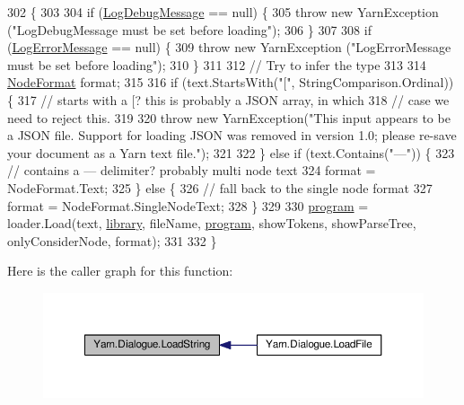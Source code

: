 \begin{DoxyCode}
302                                                                                                            
                                                 \{
303 
304             \textcolor{keywordflow}{if} (\hyperlink{a00088_a381f48bb0fbb294f8cf44ca57f11be31}{LogDebugMessage} == null) \{
305                 \textcolor{keywordflow}{throw} \textcolor{keyword}{new} YarnException (\textcolor{stringliteral}{"LogDebugMessage must be set before loading"});
306             \}
307 
308             \textcolor{keywordflow}{if} (\hyperlink{a00088_a9801e83dd044d6498fdf6ebcc6bec5ac}{LogErrorMessage} == null) \{
309                 \textcolor{keywordflow}{throw} \textcolor{keyword}{new} YarnException (\textcolor{stringliteral}{"LogErrorMessage must be set before loading"});
310             \}
311 
312             \textcolor{comment}{// Try to infer the type}
313 
314             \hyperlink{a00048_ad7ebb46e7309ead8767383a672b3272f}{NodeFormat} format;
315 
316             \textcolor{keywordflow}{if} (text.StartsWith(\textcolor{stringliteral}{"["}, StringComparison.Ordinal)) \{
317                 \textcolor{comment}{// starts with a [? this is probably a JSON array, in which}
318                 \textcolor{comment}{// case we need to reject this.}
319 
320                 \textcolor{keywordflow}{throw} \textcolor{keyword}{new} YarnException(\textcolor{stringliteral}{"This input appears to be a JSON file. Support for loading JSON was
       removed in version 1.0; please re-save your document as a Yarn text file."});
321                 
322             \} \textcolor{keywordflow}{else} \textcolor{keywordflow}{if} (text.Contains(\textcolor{stringliteral}{"---"})) \{
323                 \textcolor{comment}{// contains a --- delimiter? probably multi node text}
324                 format = NodeFormat.Text;
325             \} \textcolor{keywordflow}{else} \{
326                 \textcolor{comment}{// fall back to the single node format}
327                 format = NodeFormat.SingleNodeText;
328             \}
329 
330             \hyperlink{a00088_a0a1cca92325f430425d784d416cb5c2b}{program} = loader.Load(text, \hyperlink{a00088_ae660d4cfb6e296358d2f61d8ee74c66a}{library}, fileName, \hyperlink{a00088_a0a1cca92325f430425d784d416cb5c2b}{program}, showTokens, 
      showParseTree, onlyConsiderNode, format);
331 
332         \}
\end{DoxyCode}


Here is the caller graph for this function\-:
\nopagebreak
\begin{figure}[H]
\begin{center}
\leavevmode
\includegraphics[width=350pt]{a00088_a7b66187877ec8a2bfee2298d3dd16706_icgraph}
\end{center}
\end{figure}


